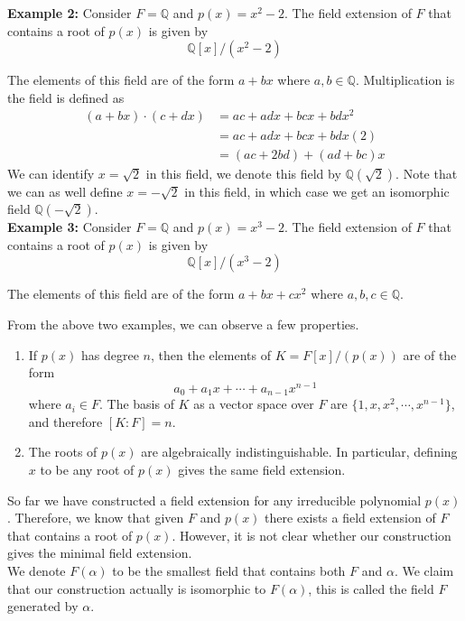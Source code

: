 \documentclass[11pt]{article}
\begin{document}
\textbf{Example 2:} Consider $F=\mathbb{Q}$ and $p(x)=x^2-2$. The field extension of $F$ that contains a root of $p(x)$ is given by 
\[\mathbb{Q}[x]/(x^2-2)\]

The elements of this field are of the form $a+bx$ where $a, b \in \mathbb{Q}$. Multiplication is the field is defined as 
\begin{align*}
  (a+bx) \cdot (c+dx) &= ac + adx + bcx + bdx^2 \\
  &= ac + adx + bcx + bdx(2) \\
  &= (ac+2bd) + (ad+bc)x
\end{align*}
We can identify $x=\sqrt{2}$ in this field, we denote this field by $\mathbb{Q}(\sqrt{2})$. Note that we can as well define $x=-\sqrt{2}$ in this field, in which case we get an isomorphic field $\mathbb{Q}(-\sqrt{2})$. \\

\textbf{Example 3:} Consider $F=\mathbb{Q}$ and $p(x)=x^3-2$. The field extension of $F$ that contains a root of $p(x)$ is given by 
\[\mathbb{Q}[x]/(x^3-2)\]

The elements of this field are of the form $a+bx+cx^2$ where $a, b, c \in \mathbb{Q}$. 

From the above two examples, we can observe a few properties.

\begin{enumerate}
  \item If $p(x)$ has degree $n$, then the elements of $K=F[x]/(p(x))$ are of the form 
  \[a_0 + a_1 x + \cdots + a_{n-1} x^{n-1}\]
  where $a_i \in F$. The basis of $K$ as a vector space over $F$ are $\{1, x, x^2, \cdots, x^{n-1}\}$, and therefore $[K:F]=n$.
  \item The roots of $p(x)$ are algebraically indistinguishable. In particular, defining $x$ to be any root of $p(x)$ gives the same field extension. 
\end{enumerate}

So far we have constructed a field extension for any irreducible polynomial $p(x)$. Therefore, we know that given $F$ and $p(x)$ there exists a field extension of $F$ that contains a root of $p(x)$. However, it is not clear whether our construction gives the minimal field extension. \\

We denote $F(\alpha)$ to be the smallest field that contains both $F$ and $\alpha$. We claim that our construction actually is isomorphic to $F(\alpha)$, this is called the field $F$ generated by $\alpha$. \\
\end{document}
